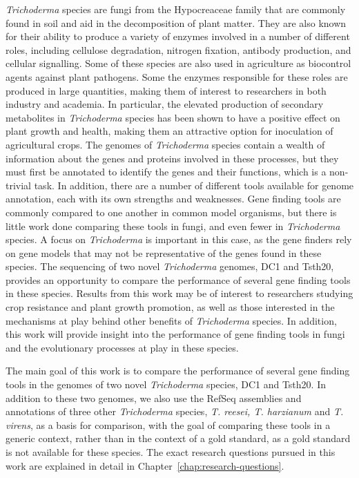 \textit{Trichoderma} species are fungi from the Hypocreaceae family
 that are commonly found in soil and aid in the decomposition of plant matter.
 They are also known for their ability to produce a variety of enzymes involved in a number of different roles, including cellulose degradation, nitrogen fixation, antibody production, and cellular signalling. Some of these species are also used in agriculture as biocontrol agents against plant pathogens. Some the enzymes responsible for these roles are produced in large quantities, making them of interest to researchers in both industry and academia. In particular, the elevated production of secondary metabolites in \textit{Trichoderma} species has been shown to have a positive effect on plant growth and health, making them an attractive option for inoculation of agricultural crops. The genomes of \textit{Trichoderma} species contain a wealth of information about the genes and proteins involved in these processes, but they must first be annotated to identify the genes and their functions, which is a non-trivial task. In addition, there are a number of different tools available for genome annotation, each with its own strengths and weaknesses. Gene finding tools are commonly compared to one another in common model organisms, but there is little work done comparing these tools in fungi, and even fewer in \textit{Trichoderma} species. A focus on \textit{Trichoderma} is important in this case, as the gene finders rely on gene models that may not be representative of the genes found in these species.
  The sequencing of two novel \textit{Trichoderma} genomes, DC1 and Tsth20, provides an opportunity to compare the performance of several gene finding tools in these species. Results from this work may be of interest to researchers studying crop resistance and plant growth promotion, as well as those interested in the mechanisms at play behind other benefits of \textit{Trichoderma} species. In addition, this work will provide insight into the performance of gene finding tools in fungi and the evolutionary processes at play in these species.

 The main goal of this work is to compare the performance of several gene finding tools in the genomes of two novel \textit{Trichoderma} species, DC1 and Tsth20. In addition to these two genomes, we also use the RefSeq assemblies and annotations of three other \textit{Trichoderma} species, \textit{T. reesei, T. harzianum} and \textit{T. virens}, as a basis for comparison, with the goal of comparing these tools in a generic context, rather than in the context of a gold standard, as a gold standard is not available for these species. The exact research questions pursued in this work are explained in detail in Chapter~\ref{chap:research-questions}. 

